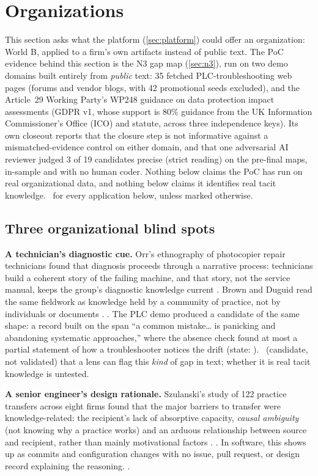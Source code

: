 \section{Organizations}
\label{sec:organizations}

This section asks what the platform (\cref{sec:platform}) could offer an organization: World B,
applied to a firm's own artifacts instead of public text. The PoC evidence behind this section is
the N3 gap map (\cref{sec:n3}), run on two demo domains built entirely from \emph{public} text: 35
fetched PLC-troubleshooting web pages (forums and vendor blogs, with 42 promotional seeds excluded),
and the Article~29 Working Party's WP248 guidance on data protection impact assessments (GDPR v1,
whose support is 80\% guidance from the UK Information Commissioner's Office (ICO) and statute, across three independence keys). Its own
closeout reports that the closure step is not informative against a mismatched-evidence control on either domain,
and that one adversarial AI reviewer judged 3 of 19 candidates precise (strict reading) on the pre-final maps, in-sample and with no human coder. Nothing below claims the PoC has run on real organizational
data, and nothing below claims it identifies real tacit knowledge. \evint\ for every application
below, unless marked otherwise.

\subsection{Three organizational blind spots}
\label{sec:org-blindspots}

\textbf{A technician's diagnostic cue.} Orr's ethnography of photocopier repair technicians found
that diagnosis proceeds through a narrative process: technicians build a coherent story of the
failing machine, and that story, not the service manual, keeps the group's diagnostic knowledge
current \parencite{orr1996talking}. Brown and Duguid read the same fieldwork as knowledge held by a
community of practice, not by individuals or documents \parencite{brown1991organizational}.
\evlit. The PLC demo produced a candidate of the same shape: a record built on the span ``a common
mistake\dots{} is panicking and abandoning systematic approaches,'' where the absence check found
at most a partial statement of how a troubleshooter notices the drift (state: ).
\evobs\ (candidate, not validated) that a lens can flag this \emph{kind} of gap in text; whether it
is real tacit knowledge is untested.

\textbf{A senior engineer's design rationale.} Szulanski's study of 122 practice transfers across
eight firms found that the major barriers to transfer were knowledge-related: the recipient's lack of
absorptive capacity, \emph{causal ambiguity} (not knowing why a practice works) and an arduous
relationship between source and recipient, rather than mainly motivational factors \parencite{szulanski1996exploring}. \evlit. In software,
this shows up as commits and configuration changes with no issue, pull request, or design record
explaining the reasoning. \evint.

